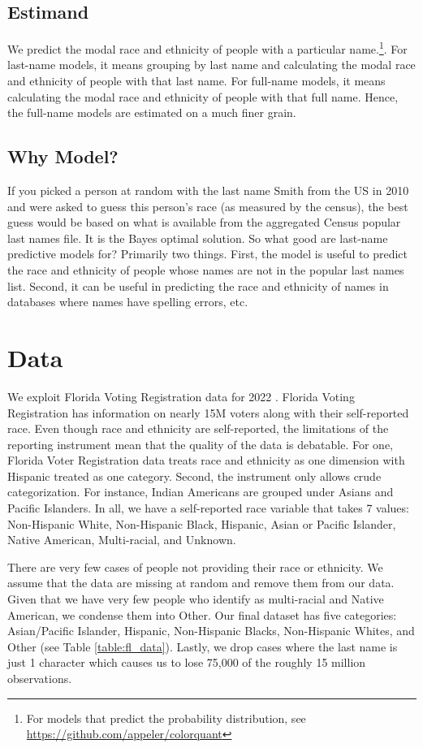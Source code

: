 \documentclass[12pt, letterpaper]{article}
\begin{document}
\subsection*{Estimand} We predict the modal race and ethnicity of people with a particular name.\footnote{For models that predict the probability distribution, see \url{https://github.com/appeler/colorquant}}. For last-name models, it means grouping by last name and calculating the modal race and ethnicity of people with that last name. For full-name models, it means calculating the modal race and ethnicity of people with that full name. Hence, the full-name models are estimated on a much finer grain.

\subsection*{Why Model?} If you picked a person at random with the last name Smith from the US in 2010 and were asked to guess this person's race (as measured by the census), the best guess would be based on what is available from the aggregated Census popular last names file. It is the Bayes optimal solution. So what good are last-name predictive models for? Primarily two things. First, the model is useful to predict the race and ethnicity of people whose names are not in the popular last names list. Second, it can be useful in predicting the race and ethnicity of names in databases where names have spelling errors, etc.

\section*{Data}
We exploit Florida Voting Registration data for 2022 \citep{sood_2017}. Florida Voting Registration has information on nearly 15M voters along with their self-reported race. Even though race and ethnicity are self-reported, the limitations of the reporting instrument mean that the quality of the data is debatable. For one, Florida Voter Registration data treats race and ethnicity as one dimension with Hispanic treated as one category. Second, the instrument only allows crude categorization. For instance, Indian Americans are grouped under Asians and Pacific Islanders. In all, we have a self-reported race variable that takes 7 values: Non-Hispanic White, Non-Hispanic Black, Hispanic, Asian or Pacific Islander, Native American, Multi-racial, and Unknown. 

There are very few cases of people not providing their race or ethnicity. We assume that the data are missing at random and remove them from our data. Given that we have very few people who identify as multi-racial and Native American, we condense them into Other. Our final dataset has five categories: Asian/Pacific Islander, Hispanic, Non-Hispanic Blacks, Non-Hispanic Whites, and Other (see Table \ref{table:fl_data}). Lastly, we drop cases where the last name is just 1 character which causes us to lose 75,000 of the roughly 15 million observations. 
\end{document}
